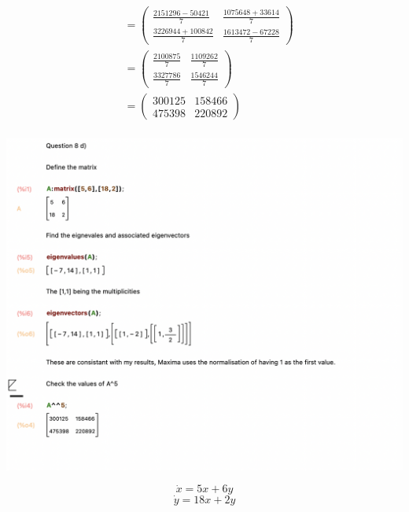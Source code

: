 \documentclass{tufte-handout}
\begin{document}
\begin{question}
\begin{align*}
&= \begin{pmatrix}
  \frac{2151296 - 50421}{7} & \frac{1075648 + 33614}{7}\\
  \frac{3226944 + 100842}{7} & \frac{1613472 - 67228}{7}      
\end{pmatrix} \\[8pt]
&= \begin{pmatrix}
  \frac{2100875}{7} & \frac{1109262}{7}\\
  \frac{3327786}{7} & \frac{1546244}{7}      
\end{pmatrix} \\[8pt]
&= \begin{pmatrix}
  300125 & 158466\\
  475398 & 220892
\end{pmatrix} \\[8pt]      
\end{align*}

\vspace{3cm}

\qpart

\includegraphics[scale=0.5]{question_8_d.png}

\qpart

\[ \dot{x} = 5x + 6y \]
\[ \dot{y} = 18x + 2y \]



\end{question}
\end{document}
